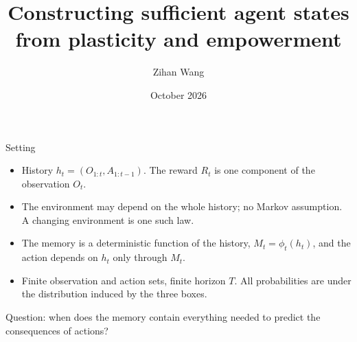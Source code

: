 \documentclass[11pt,aspectratio=169]{beamer}
\title{Constructing sufficient agent states\\ from plasticity and empowerment}
\author{Zihan Wang}
\date{October 2026}
\begin{document}
\begin{frame}
\titlepage
\end{frame}

\begin{frame}[shrink=6]{Setting}
\begin{center}
\end{center}
\vspace{2mm}
\begin{itemize}
\item History $h_t = (O_{1:t}, A_{1:t-1})$. The reward $R_t$ is one component of the observation $O_t$.
\item The environment may depend on the whole history; no Markov assumption. A changing environment is one such law.
\item The memory is a deterministic function of the history, $M_t = \phi_t(h_t)$, and the action depends on $h_t$ only through $M_t$.
\item Finite observation and action sets, finite horizon $T$. All probabilities are under the distribution induced by the three boxes.
\end{itemize}
\vspace{2mm}
Question: when does the memory contain everything needed to predict the consequences of actions?
\end{frame}
\end{document}
